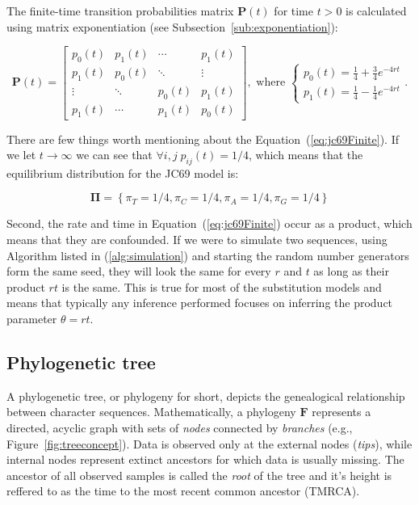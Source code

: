 \noindent
The finite-time transition probabilities matrix $\mathbf{P}(t)$ for time $t>0$ is calculated using matrix exponentiation  (see Subsection~\ref{sub:exponentiation}):

\begin{equation}
\mathbf{P}\left(t\right)=\left[\begin{array}{cccc}
p_{0}(t) & p_{1}(t) & \cdots & p_{1}(t)\\
p_{1}(t) & p_{0}(t) & \ddots & \vdots\\
\vdots & \ddots & p_{0}(t) & p_{1}(t)\\
p_{1}(t) & \cdots & p_{1}(t) & p_{0}(t)
\end{array}\right],\text{ where }\ensuremath{\begin{cases}
p_{0}(t)=\frac{1}{4}+\frac{3}{4}e^{-4rt}\\
p_{1}(t)=\frac{1}{4}-\frac{1}{4}e^{-4rt}
\end{cases}}.
\label{eq:jc69Finite}
\end{equation}

\noindent
There are few things worth mentioning about the Equation~(\ref{eq:jc69Finite}).
If we let $t\rightarrow \infty$ we can see that $\forall i,j\; p_{ij}(t)=1/4$, which means that the equilibrium distribution for the JC69 model is: 

\begin{equation}
\mathbf{\Pi}=\left\{ \pi_{T}=1/4,\pi_{C}=1/4,\pi_{A}=1/4,\pi_{G}=1/4\right\}
\label{eq:jc69Steady}
\end{equation}

\noindent
Second, the rate and time in Equation~(\ref{eq:jc69Finite}) occur as a product, which means that they are confounded.
If we were to simulate two sequences, using Algorithm listed in (\ref{alg:simulation}) and starting the random number generators form the same seed, they will look the same for every $r$ and $t$ as long as their product $rt$ is the same.
This is true for most of the substitution models and means that typically any inference performed focuses on inferring the product parameter $\theta=rt$.

\subsection{Phylogenetic tree}

A phylogenetic tree, or phylogeny for short, depicts the genealogical relationship between character sequences.
Mathematically, a phylogeny $\mathbf{F}$ represents a directed, acyclic graph with sets of \emph{nodes} connected by \emph{branches} (e.g., Figure~\ref{fig:treeconcept}).
Data is observed only at the external nodes (\emph{tips}), while internal nodes represent extinct ancestors for which data is usually missing.
The ancestor of all observed samples is called the \emph{root} of the tree and it's height is reffered to as the time to the most recent common ancestor (TMRCA).

